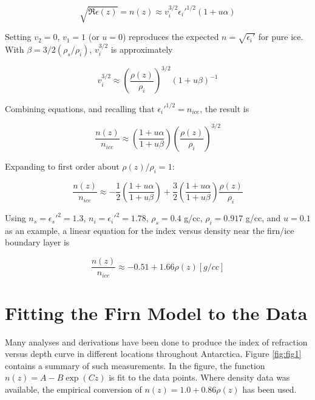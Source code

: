 \documentclass[12pt]{article}
\begin{document}
\begin{equation}
\sqrt{\Re{\epsilon(z)}} = n(z) \approx v_i^{3/2}\epsilon_i'^{1/2}(1+u\alpha)
\end{equation}

Setting $v_2 = 0$, $v_1 = 1$ (or $u=0$) reproduces the expected $n = \sqrt{\epsilon_i'}$ for pure ice.  With $\beta = 3/2 (\rho_s/\rho_i)$, $v_i^{3/2}$ is approximately

\begin{equation}
v_i^{3/2} \approx \left(\frac{\rho(z)}{\rho_i}\right)^{3/2}(1+u\beta)^{-1}
\end{equation}

Combining equations, and recalling that $\epsilon_i'^{1/2} = n_{ice}$, the result is

\begin{equation}
\frac{n(z)}{n_{ice}} \approx \left( \frac{1+u\alpha}{1+u\beta} \right) \left( \frac{\rho(z)}{\rho_i} \right)^{3/2}
\end{equation}

Expanding to first order about $\rho(z)/\rho_i = 1$:

\begin{equation}
\frac{n(z)}{n_{ice}} \approx -\frac{1}{2}\left( \frac{1+u\alpha}{1+u\beta} \right) + \frac{3}{2}\left( \frac{1+u\alpha}{1+u\beta} \right) \frac{\rho(z)}{\rho_i}
\end{equation}

Using $n_s = \epsilon_s'^2 = 1.3$, $n_i = \epsilon_i'^2 = 1.78$, $\rho_s = 0.4$ g/cc, $\rho_i = 0.917$ g/cc, and $u=0.1$ as an example, a linear equation for the index versus density near the firn/ice boundary layer is

\begin{equation}
\frac{n(z)}{n_{ice}} \approx -0.51 + 1.66 \rho(z) [g/cc]
\end{equation}

\section{Fitting the Firn Model to the Data}

Many analyses and derivations have been done to produce the index of refraction versus depth curve in different locations throughout Antarctica.  Figure \ref{fig:fig1} contains a summary of such measurements.  In the figure, the function $n(z) = A-B\exp(Cz)$ is fit to the data points.  Where density data was available, the empirical conversion of $n(z) = 1.0 + 0.86\rho(z)$ has been used.
\end{document}
